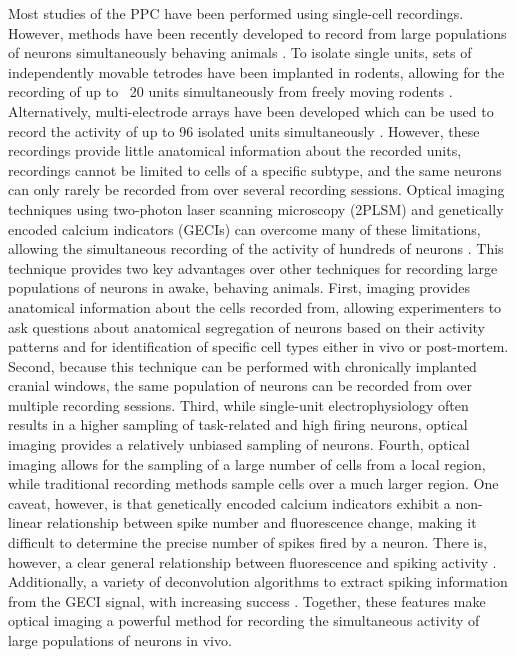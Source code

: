 Most studies of the PPC have been performed using single-cell recordings. However, methods have been recently developed to record from large populations of neurons simultaneously behaving animals \citep{Miller:2008be}. To isolate single units, sets of independently movable tetrodes have been implanted in rodents, allowing for the recording of up to ~20 units simultaneously from freely moving rodents \citep{Kepecs:2008fp, Davidson:2009kv}. Alternatively, multi-electrode arrays have been developed which can be used to record the activity of up to 96 isolated units simultaneously \citep{Churchland:2012bq}. However, these recordings provide little anatomical information about the recorded units, recordings cannot be limited to cells of a specific subtype, and the same neurons can only rarely be recorded from over several recording sessions. Optical imaging techniques using two-photon laser scanning microscopy (2PLSM) and genetically encoded calcium indicators (GECIs) \citep{Chen:2013fc, Looger:2012dq} can overcome many of these limitations, allowing the simultaneous recording of the activity of hundreds of neurons \citep{Dombeck:2010jr, Harvey:2012du, Huber:2012fw, Li:2015cd}. This technique provides two key advantages over other techniques for recording large populations of neurons in awake, behaving animals. First, imaging provides anatomical information about the cells recorded from, allowing experimenters to ask questions about anatomical segregation of neurons based on their activity patterns and for identification of specific cell types either in vivo or post-mortem. Second, because this technique can be performed with chronically implanted cranial windows, the same population of neurons can be recorded from over multiple recording sessions. Third, while single-unit electrophysiology often results in a higher sampling of task-related and high firing neurons, optical imaging provides a relatively unbiased sampling of neurons. Fourth, optical imaging allows for the sampling of a large number of cells from a local region, while traditional recording methods sample cells over a much larger region. One caveat, however, is that genetically encoded calcium indicators exhibit a non-linear relationship between spike number and fluorescence change, making it difficult to determine the precise number of spikes fired by a neuron. There is, however, a clear general relationship between fluorescence and spiking activity \citep{Tian:2009fw, Akerboom:2012jz, Dombeck:2010jr, Chen:2013fc}. Additionally, a variety of deconvolution algorithms to extract spiking information from the GECI signal, with increasing success \citep{Vogelstein:2010jl, Pnevmatikakis:2016gr, Theis:2014ey}. Together, these features make optical imaging a powerful method for recording the simultaneous activity of large populations of neurons in vivo. 

